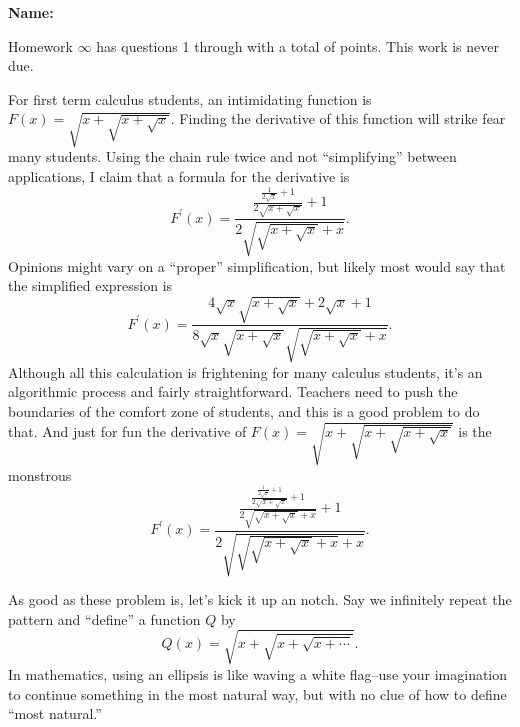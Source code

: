 \documentclass[12pt,fleqn,answers]{exam}
\newcommand{\quiz}{$\infty$}
\newcommand{\term}{Fall}
\begin{document}
\vspace{0.1in}
\noindent{}
{\bf Name:}  \\
\noindent \makebox[3.0truein][l]{\textbf{Homework \quiz, \term \/ \the\year}}
\vspace{0.1in}

\noindent  Homework \quiz\/  has questions 1 through  \numquestions \/ with a total 
of  \numpoints\/  points. 
This work is never due.


\begin{questions}

 \question For first term calculus students, an intimidating function is $F(x) = \sqrt{x + \sqrt{x + \sqrt{x}}}$. Finding the derivative of 
 this function will strike fear many students. Using the chain rule twice and not ``simplifying'' between applications, 
  I claim that a formula for the derivative is
\begin{equation*}
F^\prime(x) = \frac{\frac{\frac{1}{2 \sqrt{x}}+1}{2 \sqrt{x+\sqrt{x}}}+1}{2 \sqrt{\sqrt{x+\sqrt{x}}+x}}.
\end{equation*}
Opinions might vary on a ``proper'' simplification, but likely most would say that the simplified expression is
\begin{equation*}
F^\prime(x) = \frac{4 \sqrt{x} \sqrt{x+\sqrt{x}}+2 \sqrt{x}+1}{8 \sqrt{x} \sqrt{x+\sqrt{x}} \sqrt{\sqrt{x+\sqrt{x}}+x}}.
  \end{equation*}
  Although all this calculation is frightening for many calculus students, it's an algorithmic process and fairly straightforward.  Teachers need to push
  the boundaries of the comfort zone of students, and this is a good problem to do that.  And just for fun the derivative of 
  $F(x) = \sqrt{x+\sqrt{x + \sqrt{x + \sqrt{x}}}}$ is the monstrous   
  \begin{equation*}
 F^\prime(x) =  \frac{\frac{\frac{\frac{1}{2 \sqrt{x}}+1}{2 \sqrt{x+\sqrt{x}}}+1}{2 \sqrt{\sqrt{x+\sqrt{x}}+x}}+1}{2 \sqrt{\sqrt{\sqrt{x+\sqrt{x}}+x}+x}}.
  \end{equation*}
  
  \quad As good as these problem is, let's kick it up an notch.  Say we infinitely repeat the pattern and ``define''  a function $Q$ by
  \begin{equation*}
 Q(x) = \sqrt{x + \sqrt{x + \sqrt{x + \cdots}}}.
\end{equation*}
In mathematics, using an ellipsis is like waving a white flag--use your imagination to continue something in the most natural way, 
but with no clue of how to define ``most natural.''  


\end{questions}
\end{document}
